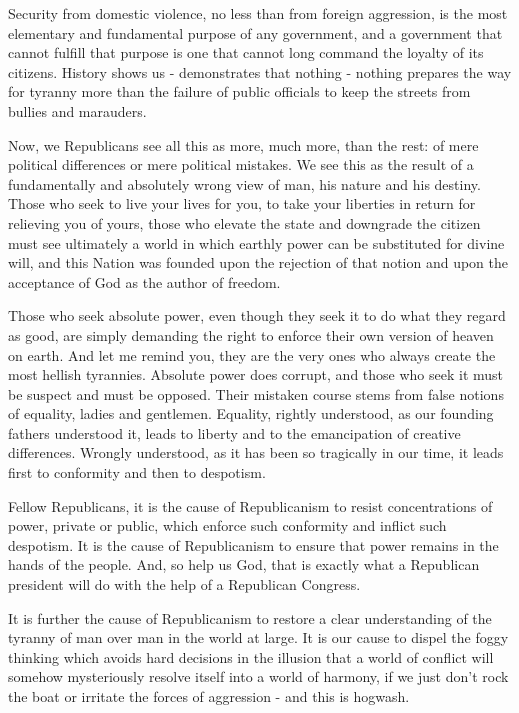 \documentclass{article}
\begin{document}
Security from domestic violence, no less than from foreign aggression, is the
most elementary and fundamental purpose of any government, and a government
that cannot fulfill that purpose is one that cannot long command the loyalty of
its citizens. History shows us - demonstrates that nothing - nothing prepares
the way for tyranny more than the failure of public officials to keep the
streets from bullies and marauders.

Now, we Republicans see all this as more, much more, than the rest: of mere
political differences or mere political mistakes. We see this as the result of
a fundamentally and absolutely wrong view of man, his nature and his destiny.
Those who seek to live your lives for you, to take your liberties in return for
relieving you of yours, those who elevate the state and downgrade the citizen
must see ultimately a world in which earthly power can be substituted for
divine will, and this Nation was founded upon the rejection of that notion and
upon the acceptance of God as the author of freedom.

Those who seek absolute power, even though they seek it to do what they regard
as good, are simply demanding the right to enforce their own version of heaven
on earth. And let me remind you, they are the very ones who always create the
most hellish tyrannies. Absolute power does corrupt, and those who seek it must
be suspect and must be opposed. Their mistaken course stems from false notions
of equality, ladies and gentlemen. Equality, rightly understood, as our
founding fathers understood it, leads to liberty and to the emancipation of
creative differences. Wrongly understood, as it has been so tragically in our
time, it leads first to conformity and then to despotism.

Fellow Republicans, it is the cause of Republicanism to resist concentrations
of power, private or public, which enforce such conformity and inflict such
despotism. It is the cause of Republicanism to ensure that power remains in the
hands of the people. And, so help us God, that is exactly what a Republican
president will do with the help of a Republican Congress.

It is further the cause of Republicanism to restore a clear understanding of
the tyranny of man over man in the world at large. It is our cause to dispel
the foggy thinking which avoids hard decisions in the illusion that a world of
conflict will somehow mysteriously resolve itself into a world of harmony, if
we just don't rock the boat or irritate the forces of aggression - and this is
hogwash.
\end{document}
